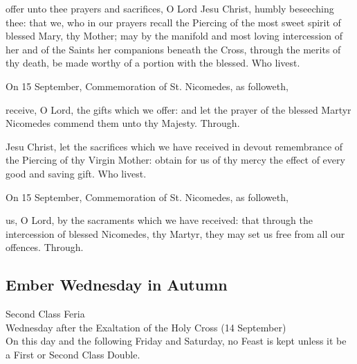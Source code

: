 
\secret
{} offer unto thee prayers and sacrifices, O Lord Jesu Christ, humbly beseeching thee: that we, who in our prayers recall the Piercing of the most sweet spirit of blessed Mary, thy Mother; may by the manifold and most loving intercession of her and of the Saints her companions beneath the Cross, through the merits of thy death, be made worthy of a portion with the blessed. Who livest.\\%
\begin{rubric}
	 On 15 September, Commemoration of St. Nicomedes, as followeth,
\end{rubric}
 receive, O Lord, the gifts which we offer: and let the prayer of the blessed Martyr Nicomedes commend them unto thy Majesty. Through.


\vspace{-0.25\baselineskip}

\postcommunion

\vspace{-0.1\baselineskip}

 Jesu Christ, let the sacrifices which we have received in devout remembrance of the Piercing of thy Virgin Mother: obtain for us of thy mercy the effect of every good and saving gift. Who livest.

\begin{rubric}
	 On 15 September, Commemoration of St. Nicomedes, as followeth,
\end{rubric}
 us, O Lord, by the sacraments which we have received: that through the intercession of blessed Nicomedes, thy Martyr, they may set us free from all our offences. Through.




\subsection{Ember Wednesday in Autumn}
\begin{inhead}
    {Second Class Feria\\
Wednesday after the Exaltation of the Holy Cross (14 September)\\
On this day and the following Friday and Saturday, no Feast is kept unless it be a First or Second Class Double.}
\end{inhead}
\par\noindent

